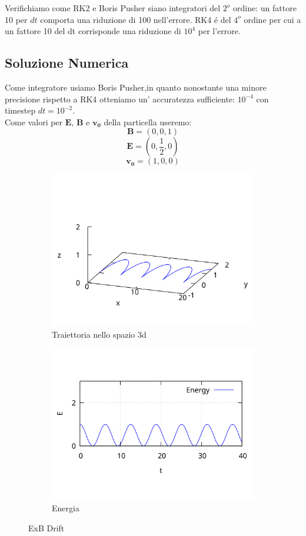 \documentclass[11pt]{article}
\begin{document}
Verifichiamo come RK2 e Boris Pusher siano integratori del $2^o$ ordine: un fattore 10 per $dt$ comporta una riduzione di 100 nell'errore. RK4 é del $4^o$ ordine per cui a un fattore 10 del dt corrisponde una riduzione di $10^4$ per l'errore.

\newpage
\subsection{Soluzione Numerica}
Come integratore usiamo Boris Pusher,in quanto nonostante una minore precisione rispetto a RK4 otteniamo un' accuratezza sufficiente: $10^{-4}$ con timestep $dt = 10^{-2}$.\\
Come valori per $\mathbf{E}$, $\mathbf{B}$ e $\mathbf{v_0}$ della particella useremo:
$$\mathbf{B}=(0,0,1) $$
$$\mathbf{E}=(0,\frac{1}{2},0) $$
$$\mathbf{v_0} = (1,0,0)$$
\begin{figure}[ht]
\begin{subfigure}{.5\textwidth}
  \centering
  \includegraphics[width=.9\linewidth]{img/3dposizionedrift.png}  
  \caption{Traiettoria nello spazio 3d}
\end{subfigure}
\begin{subfigure}{.5\textwidth}
  \centering
  \includegraphics[width=.9\linewidth]{img/energia.png}  
  \caption{Energia}
\end{subfigure}
\caption{ExB Drift}
\end{figure}%
\end{document}
